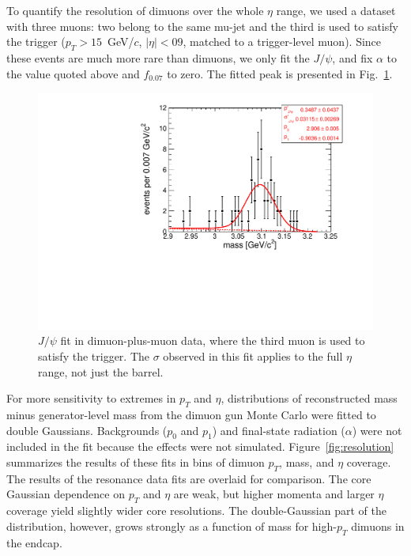 \documentclass[12pt]{cms-tdr}
\begin{document}
To quantify the resolution of dimuons over the whole $\eta$ range, we
used a dataset with three muons: two belong to the same mu-jet and the
third is used to satisfy the trigger ($p_T > 15$~GeV/$c$, $|\eta| <
09$, matched to a trigger-level muon).  Since these events are much
more rare than dimuons, we only fit the $J/\psi$, and fix $\alpha$ to
the value quoted above and $f_{0.07}$ to zero.  The fitted peak is
presented in Fig.~\ref{fig:respeak_jpsi2}.

\begin{figure}
\begin{center}
\includegraphics[width=0.5\linewidth]{PLOTS/respeak_jpsi2.pdf}
\end{center}

\caption{$J/\psi$ fit in dimuon-plus-muon data, where the third muon
  is used to satisfy the trigger.  The $\sigma$ observed in this fit
  applies to the full $\eta$ range, not just the
  barrel. \label{fig:respeak_jpsi2}}
\end{figure}

For more sensitivity to extremes in $p_T$ and $\eta$, distributions of
reconstructed mass minus generator-level mass from the dimuon gun
Monte Carlo were fitted to double Gaussians.  Backgrounds ($p_0$ and
$p_1$) and final-state radiation ($\alpha$) were not included in the
fit because the effects were not simulated.
Figure~\ref{fig:resolution} summarizes the results of these fits in
bins of dimuon $p_T$, mass, and $\eta$ coverage.  The results of the
resonance data fits are overlaid for comparison.  The core Gaussian
dependence on $p_T$ and $\eta$ are weak, but higher momenta and larger
$\eta$ coverage yield slightly wider core resolutions.  The
double-Gaussian part of the distribution, however, grows strongly as a
function of mass for high-$p_T$ dimuons in the endcap.
\end{document}
